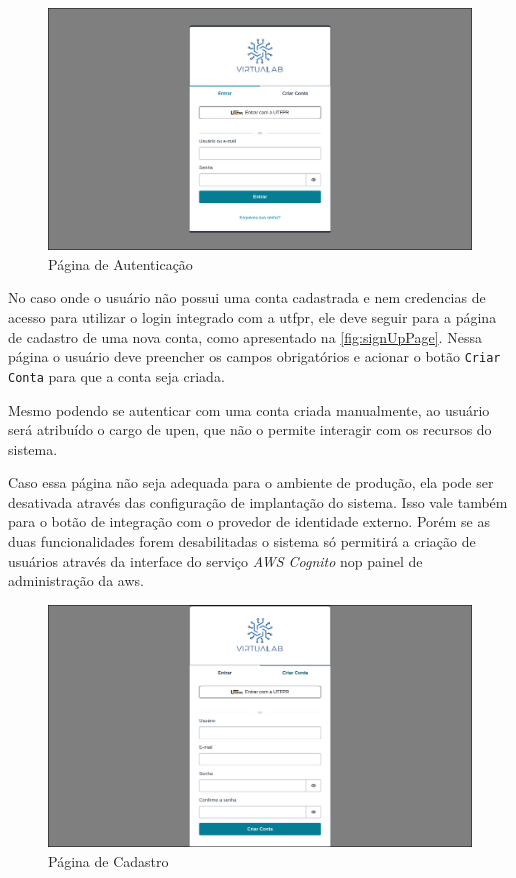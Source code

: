 \begin{figure}[H]
\caption{Página de Autenticação}
\label{fig:signInPage}
\includegraphics[width=\textwidth]{capitulos/3-resultados/files/sign-in.png}
\end{figure}

No caso onde o usuário não possui uma conta cadastrada e nem credencias de acesso para utilizar o login integrado com a \gls{utfpr}, ele deve seguir para a página de cadastro de uma nova conta, como apresentado na \autoref{fig:signUpPage}. Nessa página o usuário deve preencher os campos obrigatórios e acionar o botão \texttt{Criar Conta}  para que a conta seja criada.

Mesmo podendo se autenticar com uma conta criada manualmente, ao usuário será atribuído o cargo de \gls{upen}, que não o permite interagir com os recursos do sistema.

Caso essa página não seja adequada para o ambiente de produção, ela pode ser desativada através das configuração de implantação do sistema. Isso vale também para o botão de integração com o provedor de identidade externo. Porém se as duas funcionalidades forem desabilitadas o sistema só permitirá a criação de usuários através da interface do serviço \textit{AWS Cognito} nop painel de administração da \gls{aws}.


\begin{figure}[H]
\caption{Página de Cadastro}
\label{fig:signUpPage}
\includegraphics[width=\textwidth]{capitulos/3-resultados/files/sign-up.png}
\end{figure}

